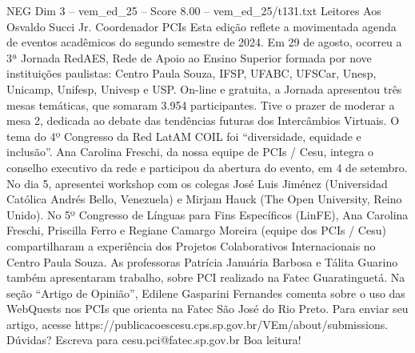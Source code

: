 \begin{textsample}{NEG Dim 3 – vem\_ed\_25 – Score 8.00 – vem\_ed\_25/t131.txt}  \label{ex:f3_neg_165}
Leitores Aos Osvaldo Succi Jr.
Coordenador PCIs Esta edição reflete a movimentada agenda de eventos acadêmicos do segundo semestre de 2024.
Em 29 de agosto, ocorreu a 3ª Jornada RedAES, Rede de Apoio ao Ensino Superior formada por nove instituições paulistas: Centro Paula Souza, IFSP, UFABC, UFSCar, Unesp, Unicamp, Unifesp, Univesp e USP.
On-line e gratuita, a Jornada apresentou três mesas temáticas, que somaram 3.954 participantes.
Tive o prazer de moderar a mesa 2, dedicada ao debate das tendências futuras dos Intercâmbios Virtuais.
O tema do 4º Congresso da Red LatAM COIL foi “diversidade, equidade e inclusão”.
Ana Carolina Freschi, da nossa equipe de PCIs / Cesu, integra o conselho executivo da rede e participou da abertura do evento, em 4 de setembro.
No dia 5, apresentei workshop com os colegas José Luis Jiménez (Universidad Católica Andrés Bello, Venezuela) e Mirjam Hauck (The Open University, Reino Unido).
No 5º Congresso de Línguas para Fins Específicos (LinFE), Ana Carolina Freschi, Priscilla Ferro e Regiane Camargo Moreira (equipe dos PCIs / Cesu) compartilharam a experiência dos Projetos Colaborativos Internacionais no Centro Paula Souza.
As professoras Patrícia Januária Barbosa e Tálita Guarino também apresentaram trabalho, sobre PCI realizado na Fatec Guaratinguetá.
Na seção “Artigo de Opinião”, Edilene Gasparini Fernandes comenta sobre o uso das WebQuests nos PCIs que orienta na Fatec São José do Rio Preto.
Para enviar seu artigo, acesse https://publicacoescesu.cps.sp.gov.br/VEm/about/submissions.
Dúvidas?
Escreva para cesu.pci@fatec.sp.gov.br Boa leitura!

\end{textsample}
